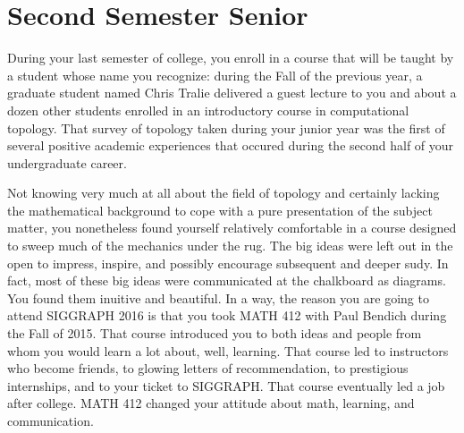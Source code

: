 \documentclass[../main.tex]{subfiles}
\begin{document}
\section{Second Semester Senior}
 
During your last semester of college, you enroll in a course that will be taught by a student whose name you recognize: during the Fall of the previous year, a graduate student named Chris Tralie delivered a guest lecture to you and about a dozen other students enrolled in an introductory course in computational topology. That survey of topology taken during your junior year was the first of several positive academic experiences that occured during the second half of your undergraduate career.

Not knowing very much at all about the field of topology and certainly lacking the mathematical background to cope with a pure presentation of the subject matter, you nonetheless found yourself relatively comfortable in a course designed to sweep much of the mechanics under the rug. The big ideas were left out in the open to impress, inspire, and possibly encourage subsequent and deeper sudy. In fact, most of these big ideas were communicated at the chalkboard as diagrams. You found them inuitive and beautiful. In a way, the reason you are going to attend SIGGRAPH 2016 is that you took MATH 412 with Paul Bendich during the Fall of 2015. That course introduced you to both ideas and people from whom you would learn a lot about, well, learning. That course led to instructors who become friends, to glowing letters of recommendation, to prestigious internships, and to your ticket to SIGGRAPH. That course eventually led a job after college. MATH 412 changed your attitude about math, learning, and communication.
\end{document}

